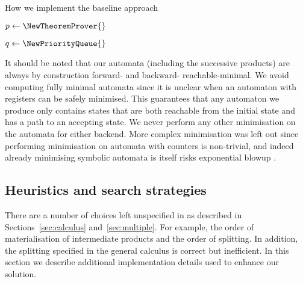 \documentclass[acmsmall,review,anonymous,screen]{acmart}\settopmatter{printfolios=true,printccs=false,printacmref=true}
\theoremstyle{definition}
\begin{document}
\begin{algorithm}
  \caption{How we implement the baseline approach}\label{alg:baseline}

  $p \gets \NewTheoremProver{}$



  $q \gets \NewPriorityQueue{}$


  

  \end{algorithm}

It should be noted that our automata (including the successive products) are
always by construction forward- and backward- reachable-minimal. We avoid
computing fully minimal automata since it is unclear when an automaton with
registers can be safely minimised. This guarantees that any automaton we produce
only contains states that are both reachable from the initial state and has a
path to an accepting state. We never perform any other minimisation on the
automata for either backend. More complex minimisation was left out since
performing minimisation on automata with counters is non-trivial, and indeed
already minimising symbolic automata is itself risks exponential blowup
\cite{minimising-symbolic}.

\subsection{Heuristics and search strategies}

There are a number of choices left unspecified in \Calculus{} as described in
Sections~\ref{sec:calculus} and~\ref{sec:multiple}. For example, the order of
materialisation of intermediate products and the order of splitting. In
addition, the splitting specified in the general calculus is correct but
inefficient. In this section we describe additional implementation details used
to enhance our solution.
\end{document}
